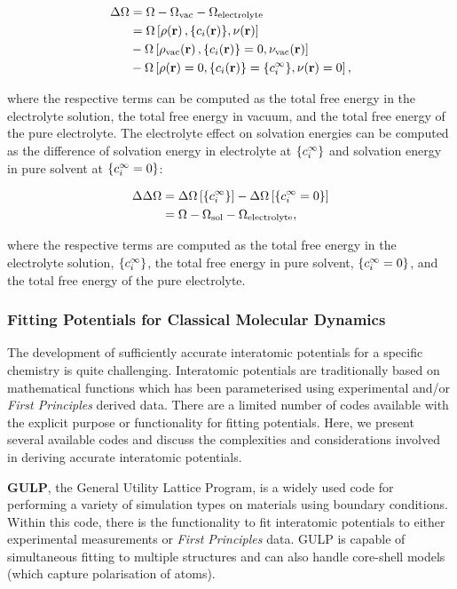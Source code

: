 \documentclass[../main.tex]{subfiles}
\begin{document}
\begin{align}
    \Delta\Omega &=\Omega-\Omega_{\textrm{vac}}-\Omega_{\textrm{electrolyte}} \\
    &=\Omega\left[\rho\ofrvec,\{\ci\ofrvec\},\nu\ofrvec\right] \\
    \nonumber
    &-\Omega\left[\rho_{\textrm{vac}}\ofrvec,\{\ci\ofrvec\}=0,\nu_{\textrm{vac}}\ofrvec\right] \\
    \nonumber
    &-\Omega\left[\rho\ofrvec=0,\{\ci\ofrvec\}=\{\cif\},\nu\ofrvec=0\right]
    \nonumber,
\end{align}

where the respective terms can be computed as the total free energy in the electrolyte solution, the total free energy in vacuum, and the total free energy of the pure electrolyte.\cite{Dziedzic2020} The electrolyte effect on solvation energies can be computed as the difference of solvation energy in electrolyte at $\{c_i^{\infty}\}$ and solvation energy in pure solvent at $\{c_i^{\infty}=0\}$:

\begin{align}
    \Delta\Delta\Omega    &= \Delta\Omega\left[{\{c_i^{\infty}\}}\right]-\Delta\Omega\left[{\{c_i^{\infty}=0\}}\right] \\
    &= \Omega - \Omega_{\textrm{sol}} - \Omega_{\textrm{electrolyte}},
\end{align}

where the respective terms are computed as the total free energy in the electrolyte solution, $\{c_i^{\infty}\}$, the total free energy in pure solvent, $\{c_i^{\infty}=0\}$, and the total free energy of the pure electrolyte. 


\subsubsection{Fitting Potentials for Classical Molecular Dynamics}
\label{sec:potential_fitting}
The development of sufficiently accurate interatomic potentials for a specific chemistry is quite challenging. Interatomic potentials are traditionally based on mathematical functions which has been parameterised using experimental and/or \textit{First Principles} derived data. \cite{jones_1924, buckingham_classical_1938} There are a limited number of codes available with the explicit purpose or functionality for fitting potentials. Here, we present several available codes and discuss the complexities and considerations involved in deriving accurate interatomic potentials.

\textbf{GULP}, \cite{GULP} the General Utility Lattice Program, is a widely used code for performing a variety of simulation types on materials using boundary conditions. \cite{gale_gulp_1997} Within this code, there is the functionality to fit interatomic potentials to either experimental measurements or \textit{First Principles} data.\cite{gale_empirical_1996} GULP is capable of simultaneous fitting to multiple structures and can also handle core-shell models (which capture polarisation of atoms).
\end{document}
